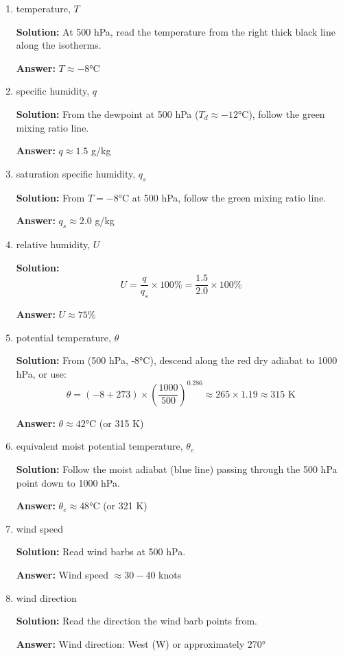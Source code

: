 \documentclass[letterpaper, 11pt]{article}
\newcommand{\1}{\mathds{1}}	%
\theoremstyle{definition}
\begin{document}
\begin{enumerate}[label=(\alph*)]
    \item temperature, $T$
    
    \textbf{Solution:} At 500 hPa, read the temperature from the right thick black line along the isotherms.
    
    \textbf{Answer:} $T \approx -8°\text{C}$
    
    \item specific humidity, $q$
    
    \textbf{Solution:} From the dewpoint at 500 hPa ($T_d \approx -12°\text{C}$), follow the green mixing ratio line.
    
    \textbf{Answer:} $q \approx 1.5$ g/kg
    
    \item saturation specific humidity, $q_s$
    
    \textbf{Solution:} From $T = -8°\text{C}$ at 500 hPa, follow the green mixing ratio line.
    
    \textbf{Answer:} $q_s \approx 2.0$ g/kg
    
    \item relative humidity, $U$
    
    \textbf{Solution:} 
    \begin{equation}
    U = \frac{q}{q_s} \times 100\% = \frac{1.5}{2.0} \times 100\%
    \end{equation}
    
    \textbf{Answer:} $U \approx 75\%$
    
    \item potential temperature, $\theta$
    
    \textbf{Solution:} From (500 hPa, -8°C), descend along the red dry adiabat to 1000 hPa, or use:
    \begin{equation}
    \theta = (-8 + 273) \times \left(\frac{1000}{500}\right)^{0.286} \approx 265 \times 1.19 \approx 315 \text{ K}
    \end{equation}
    
    \textbf{Answer:} $\theta \approx 42°\text{C}$ (or 315 K)
    
    \item equivalent moist potential temperature, $\theta_e$
    
    \textbf{Solution:} Follow the moist adiabat (blue line) passing through the 500 hPa point down to 1000 hPa.
    
    \textbf{Answer:} $\theta_e \approx 48°\text{C}$ (or 321 K)
    
    \item wind speed
    
    \textbf{Solution:} Read wind barbs at 500 hPa.
    
    \textbf{Answer:} Wind speed $\approx 30-40$ knots
    
    \item wind direction
    
    \textbf{Solution:} Read the direction the wind barb points from.
    
    \textbf{Answer:} Wind direction: West (W) or approximately 270°
\end{enumerate}
\end{document}
